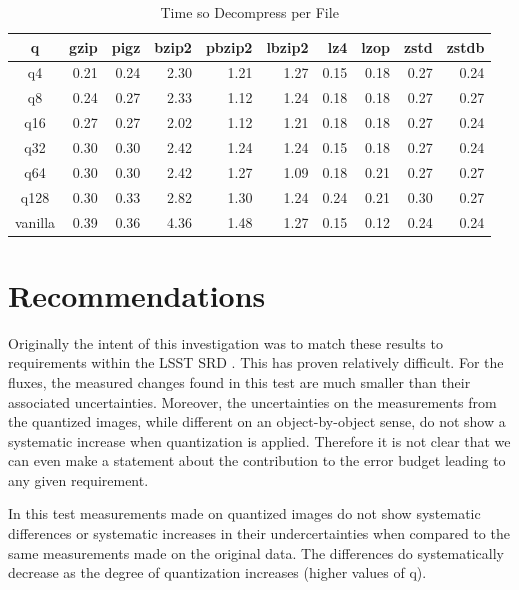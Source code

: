 \begin{table}
\caption{Time so Decompress per File}
\centering
\begin{tabular}[]{crrrrrrrrr}
\hline
 q        &  gzip & pigz & bzip2 & pbzip2 & lbzip2 & lz4 & lzop & zstd & zstdb  \\
\hline
 q4       &    0.21 &   0.24 &   2.30 &   1.21 &   1.27 &   0.15 &   0.18 &   0.27 &   0.24  \\
 q8       &    0.24 &   0.27 &   2.33 &   1.12 &   1.24 &   0.18 &   0.18 &   0.27 &   0.27  \\
 q16      &    0.27 &   0.27 &   2.02 &   1.12 &   1.21 &   0.18 &   0.18 &   0.27 &   0.24  \\
 q32      &    0.30 &   0.30 &   2.42 &   1.24 &   1.24 &   0.15 &   0.18 &   0.27 &   0.24  \\
 q64      &    0.30 &   0.30 &   2.42 &   1.27 &   1.09 &   0.18 &   0.21 &   0.27 &   0.27  \\
 q128     &    0.30 &   0.33 &   2.82 &   1.30 &   1.24 &   0.24 &   0.21 &   0.30 &   0.27  \\
 vanilla  &    0.39 &   0.36 &   4.36 &   1.48 &   1.27 &   0.15 &   0.12 &   0.24 &   0.24  \\
\hline
\end{tabular}
\label{timing_decompress}
\end{table}


\clearpage

\section{Recommendations}

Originally the intent of this investigation was to match these results to requirements within the 
LSST SRD .  This has proven relatively difficult.  For the fluxes, the measured 
changes found in this test are much smaller than their associated uncertainties.  Moreover, the
uncertainties on the measurements from the quantized images, while different on an object-by-object
sense, do not show a systematic increase when quantization is applied.  Therefore it is not clear 
that we can even make a statement about the contribution to the error budget leading to any given 
requirement.

In this test measurements made on quantized images do not show systematic differences or systematic 
increases in their undercertainties when compared to the same measurements made on the original data.  
The differences do systematically decrease as the degree of quantization increases (higher values of q).


